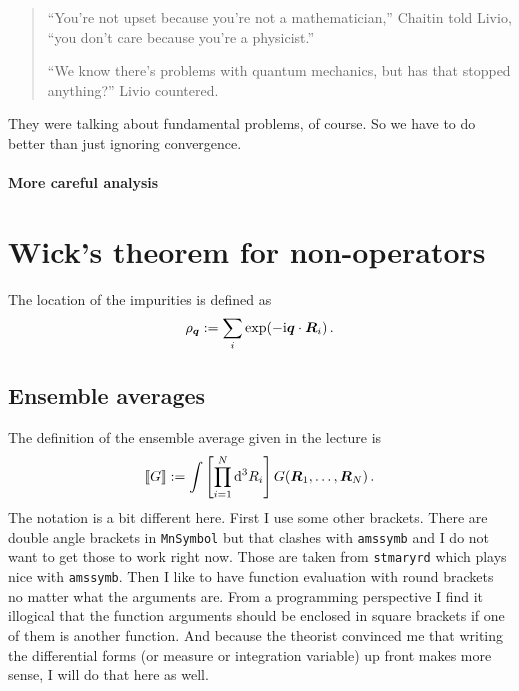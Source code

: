 \documentclass[11pt, english, fleqn, DIV=15, headinclude, BCOR=1cm]{scrartcl}
\newcommand\ensemble[1]{\llbracket #1 \rrbracket}
\begin{document}
\begin{quote}
    \enquote{You're not upset because you're not a mathematician,} Chaitin told
    Livio, \enquote{you don't care because you're a physicist.} 

    \enquote{We know there's problems with quantum mechanics, but has that
    stopped anything?} Livio countered.
\end{quote}

They were talking about fundamental problems, of course. So we have to do
better than just ignoring convergence.

\paragraph{More careful analysis}

\section{Wick's theorem for non-operators}
\label{homework:3}

The location of the impurities is defined as
\[
    \rho_{\vec q} := \sum_i \exp(- \iup \vec q \cdot \vec R_i) \,.
\]

\subsection{Ensemble averages}

The definition of the ensemble average given in the lecture is
\[
    \ensemble G := \int \sbr{\prod_{i=1}^N \dif^3 R_i} G(\vec R_1, \dotsc, \vec R_N) \,.
\]
The notation is a bit different here. First I use some other brackets. There
are double angle brackets in \texttt{MnSymbol} but that clashes with
\texttt{amssymb} and I do not want to get those to work right now. Those are
taken from \texttt{stmaryrd} which plays nice with \texttt{amssymb}. Then I
like to have function evaluation with round brackets no matter what the
arguments are. From a programming perspective I find it illogical that the
function arguments should be enclosed in square brackets if one of them is
another function. And because the theorist convinced me that writing the
differential forms (or measure or integration variable) up front makes more
sense, I will do that here as well.
\end{document}

